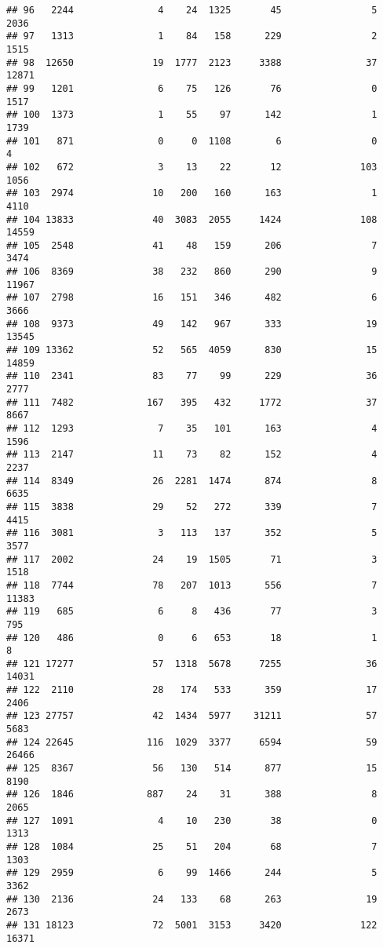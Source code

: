 \documentclass[
]{article}
\begin{document}
\begin{verbatim}
## 96   2244               4    24  1325       45                5  2036
## 97   1313               1    84   158      229                2  1515
## 98  12650              19  1777  2123     3388               37 12871
## 99   1201               6    75   126       76                0  1517
## 100  1373               1    55    97      142                1  1739
## 101   871               0     0  1108        6                0     4
## 102   672               3    13    22       12              103  1056
## 103  2974              10   200   160      163                1  4110
## 104 13833              40  3083  2055     1424              108 14559
## 105  2548              41    48   159      206                7  3474
## 106  8369              38   232   860      290                9 11967
## 107  2798              16   151   346      482                6  3666
## 108  9373              49   142   967      333               19 13545
## 109 13362              52   565  4059      830               15 14859
## 110  2341              83    77    99      229               36  2777
## 111  7482             167   395   432     1772               37  8667
## 112  1293               7    35   101      163                4  1596
## 113  2147              11    73    82      152                4  2237
## 114  8349              26  2281  1474      874                8  6635
## 115  3838              29    52   272      339                7  4415
## 116  3081               3   113   137      352                5  3577
## 117  2002              24    19  1505       71                3  1518
## 118  7744              78   207  1013      556                7 11383
## 119   685               6     8   436       77                3   795
## 120   486               0     6   653       18                1     8
## 121 17277              57  1318  5678     7255               36 14031
## 122  2110              28   174   533      359               17  2406
## 123 27757              42  1434  5977    31211               57  5683
## 124 22645             116  1029  3377     6594               59 26466
## 125  8367              56   130   514      877               15  8190
## 126  1846             887    24    31      388                8  2065
## 127  1091               4    10   230       38                0  1313
## 128  1084              25    51   204       68                7  1303
## 129  2959               6    99  1466      244                5  3362
## 130  2136              24   133    68      263               19  2673
## 131 18123              72  5001  3153     3420              122 16371

\end{verbatim}
\end{document}
